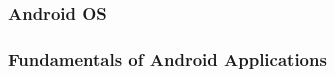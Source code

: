 \subsubsection{Android OS}


\subsubsection{Fundamentals of Android Applications}
\label{section:2.1.2}
